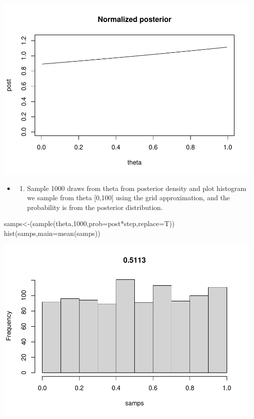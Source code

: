 \documentclass[
]{book}
\newenvironment{Shaded}{\begin{snugshade}}{\end{snugshade}}
\newcommand{\AttributeTok}[1]{\textcolor[rgb]{0.77,0.63,0.00}{#1}}
\newcommand{\DecValTok}[1]{\textcolor[rgb]{0.00,0.00,0.81}{#1}}
\newcommand{\FunctionTok}[1]{\textcolor[rgb]{0.00,0.00,0.00}{#1}}
\newcommand{\NormalTok}[1]{#1}
\newcommand{\OtherTok}[1]{\textcolor[rgb]{0.56,0.35,0.01}{#1}}
\newcommand{\SpecialCharTok}[1]{\textcolor[rgb]{0.00,0.00,0.00}{#1}}
\providecommand{\tightlist}{%
  \setlength{\itemsep}{0pt}\setlength{\parskip}{0pt}}
\theoremstyle{definition}
\theoremstyle{definition}
\theoremstyle{definition}
\theoremstyle{definition}
\theoremstyle{remark}
\begin{document}
\includegraphics{_main_files/figure-latex/unnamed-chunk-20-1.pdf}

\begin{itemize}
\item
  \begin{enumerate}
  \def\labelenumi{(\alph{enumi})}
  \setcounter{enumi}{1}
  \tightlist
  \item
    Sample 1000 draws from theta from posterior density and plot histogram
    we sample from theta {[}0,100{]} using the grid approximation, and the probability is from the posterior distribution.
  \end{enumerate}
\end{itemize}

\begin{Shaded}
\begin{Highlighting}[]
\NormalTok{  samps}\OtherTok{\textless{}{-}}\NormalTok{(}\FunctionTok{sample}\NormalTok{(theta,}\DecValTok{1000}\NormalTok{,}\AttributeTok{prob=}\NormalTok{post}\SpecialCharTok{*}\NormalTok{step,}\AttributeTok{replace=}\NormalTok{T))}
  \FunctionTok{hist}\NormalTok{(samps,}\AttributeTok{main=}\FunctionTok{mean}\NormalTok{(samps))}
\end{Highlighting}
\end{Shaded}

\includegraphics{_main_files/figure-latex/unnamed-chunk-21-1.pdf}
\end{document}
